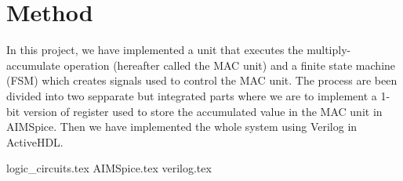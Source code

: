 \section{Method}
In this project, we have implemented a unit that executes the multiply-accumulate
operation (hereafter called the MAC unit) and a finite state machine (FSM) which creates
signals used to control the MAC unit. The process are been divided into two sepparate but integrated parts where we are to implement a 1-bit version of register used to store the accumulated value in the MAC unit in AIMSpice. Then we have implemented the whole system using Verilog in ActiveHDL.



{logic_circuits.tex}
{AIMSpice.tex}
{verilog.tex}